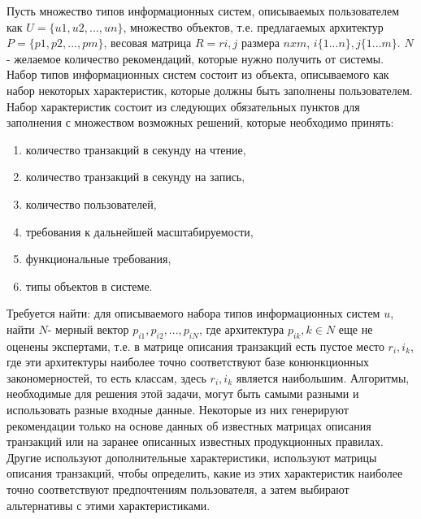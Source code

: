 Пусть множество типов информационных систем, описываемых пользователем как  $U=\{u1,u2,...,un\}$, множество объектов, т.е. предлагаемых архитектур $P=\{p1,p2,...,pm\}$, весовая матрица  $R=ri,j$ размера $nxm$,  $i\{1...n\},j\{1...m\}$. $N$ - желаемое количество рекомендаций, которые нужно получить от системы. Набор типов информационных систем состоит из объекта, описываемого как набор некоторых характеристик, которые должны быть заполнены пользователем. Набор характеристик состоит из следующих обязательных пунктов для заполнения с множеством возможных решений, которые необходимо принять:
\begin{enumerate}
\item количество транзакций в секунду на чтение,
\item количество транзакций в секунду на запись,
\item количество пользователей,
\item требования к дальнейшей масштабируемости,
\item функциональные требования,
\item типы объектов в системе.
\end{enumerate}
Требуется найти: для описываемого набора типов информационных систем $u$, найти $N $- мерный вектор $p_{i1},p_{i2},...,p_{iN}$, где архитектура $p_{ik},k\in N$  еще не оценены экспертами, т.е. в матрице описания транзакций есть пустое место $r_i,i_k$, где эти архитектуры наиболее точно соответствуют базе конюнкционных закономерностей, то есть классам, здесь $r_i,i_k$ является наибольшим. Алгоритмы, необходимые для решения этой задачи, могут быть самыми разными и использовать разные входные данные. Некоторые из них генерируют рекомендации только на основе данных об известных матрицах описания транзакций или на заранее описанных известных продукционных правилах. Другие используют дополнительные характеристики, используют матрицы описания транзакций, чтобы определить, какие из этих характеристик наиболее точно соответствуют предпочтениям пользователя, а затем выбирают альтернативы с этими характеристиками.

